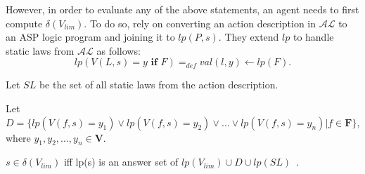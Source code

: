 However, in order to evaluate any of the above statements, an agent needs to first compute $\delta(V_{lim})$.
To do so, \citet{gelfond_authorization_2008} rely on converting an action description in $\mathcal{AL}$ to an ASP logic program and joining it to $lp(P, s)$.
They extend $lp$ to handle static laws from $\mathcal{AL}$ as follows:
\begin{equation}
    lp(V(L,s)=y \textbf{ if } F) =_{def} val(l, y) \leftarrow lp(F).
\end{equation}

Let $SL$ be the set of all static laws from the action description.

Let $D = \{lp(V(f,s)=y_1) \lor lp(V(f,s)=y_2) \lor \dots \lor lp(V(f,s)=y_n) | f \in \boldsymbol{F}\}$, where $y_1, y_2, \dots, y_n \in \boldsymbol{V}$.

\begin{definition}
    $s \in \delta(V_{lim})$ iff lp(s) is an answer set of $lp(V_{lim}) \cup D \cup lp(SL)$~\citep{gelfond_authorization_2008}.
\end{definition}

